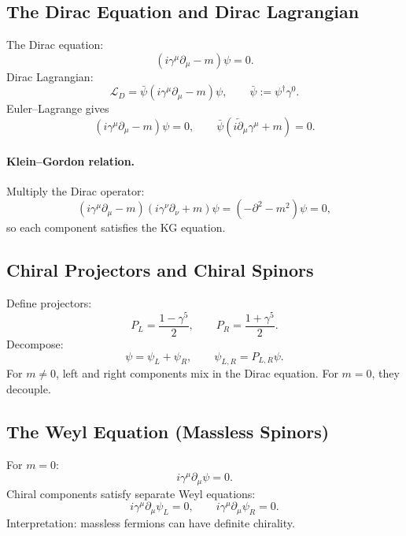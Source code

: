 \subsection{The Dirac Equation and Dirac Lagrangian}
The Dirac equation:
\begin{equation}
(i\gamma^\mu\partial_\mu-m)\psi=0.
\end{equation}
Dirac Lagrangian:
\begin{equation}
\mathcal{L}_D=\bar{\psi}(i\gamma^\mu\partial_\mu-m)\psi,
\qquad
\bar{\psi}:=\psi^\dagger\gamma^0.
\end{equation}
Euler--Lagrange gives
\begin{equation}
(i\gamma^\mu\partial_\mu-m)\psi=0,
\qquad
\bar{\psi}(i\overleftarrow{\partial}_\mu\gamma^\mu+m)=0.
\end{equation}

\paragraph{Klein--Gordon relation.}
Multiply the Dirac operator:
\begin{equation}
(i\gamma^\mu\partial_\mu-m)(i\gamma^\nu\partial_\nu+m)\psi
=
(-\partial^2-m^2)\psi=0,
\end{equation}
so each component satisfies the KG equation.

\subsection{Chiral Projectors and Chiral Spinors}
Define projectors:
\begin{equation}
P_L=\frac{1-\gamma^5}{2},\qquad P_R=\frac{1+\gamma^5}{2}.
\end{equation}
Decompose:
\begin{equation}
\psi=\psi_L+\psi_R,
\qquad
\psi_{L,R}=P_{L,R}\psi.
\end{equation}
For $m\neq 0$, left and right components mix in the Dirac equation.
For $m=0$, they decouple.

\subsection{The Weyl Equation (Massless Spinors)}
For $m=0$:
\begin{equation}
i\gamma^\mu\partial_\mu\psi=0.
\end{equation}
Chiral components satisfy separate Weyl equations:
\begin{equation}
i\gamma^\mu\partial_\mu\psi_L=0,
\qquad
i\gamma^\mu\partial_\mu\psi_R=0.
\end{equation}
Interpretation: massless fermions can have definite chirality.

